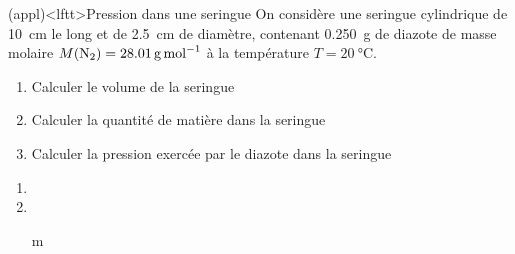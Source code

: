 \documentclass[../../main/main.tex]{subfiles}
\begin{document}
\begin{tcb}[label=appl:gp, sidebyside](appl)<lftt>{Pression dans une seringue}
	On considère une seringue cylindrique de \SI{10}{cm} le long et de
	\SI{2.5}{cm} de diamètre, contenant \SI{0.250}{g} de diazote de masse
	molaire $M({\rm N}_2) = \SI{28.01}{g.mol^{-1}}$ à la
	température $T = \SI{20}{\degreeCelsius}$.
	\begin{enumerate}
		\item Calculer le volume de la seringue
		\item Calculer la quantité de matière dans la seringue
		\item Calculer la pression exercée par le diazote dans la seringue
	\end{enumerate}
	\tcblower
	\begin{enumerate}
		\item
		\item
		\item[m]
	\end{enumerate}
\end{tcb}
\end{document}
